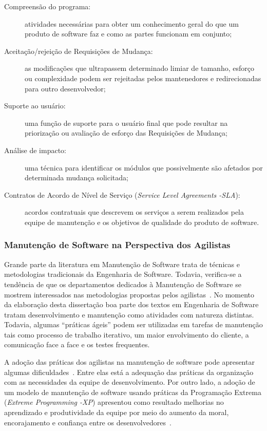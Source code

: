 \begin{description}
	\item[Compreensão do programa:] atividades necessárias para obter um
		conhecimento geral do que um produto de software faz e como as partes
		funcionam em conjunto;
    \item[Aceitação/rejeição de Requisições de Mudança:] as modificações que
        ultrapassem determinado limiar de tamanho, esforço ou complexidade podem
        ser rejeitadas pelos mantenedores e redirecionadas para outro
        desenvolvedor;
	\item[Suporte ao usuário:] uma função de suporte para o usuário final que
		pode resultar na priorização ou avaliação de esforço das Requisições
		de Mudança;
	\item[Análise de impacto:] uma técnica para identificar os módulos que
		possivelmente são afetados por determinada mudança solicitada;
	\item[Contratos de Acordo de Nível de Serviço (\textit{Service Level Agreements
		\@-\@ SLA}):] acordos contratuais que descrevem os serviços a serem
		realizados pela equipe de manutenção e os objetivos de qualidade do
		produto de software.
\end{description}

\subsubsection{Manutenção de Software na Perspectiva dos Agilistas}\label{sub:manutenção_de_software_com_método_dos_agilistas}

Grande parte da literatura em Manutenção de Software trata de técnicas e
metodologias tradicionais da Engenharia de Software. Todavia, verifica-se a
tendência de que os departamentos dedicados à Manutenção de Software se mostrem
interessados nas metodologias propostas pelos agilistas~\cite{Heeager2015}.  No
momento da elaboração desta dissertação boa parte dos textos em Engenharia de
Software tratam desenvolvimento e manutenção como atividades com natureza
distintas. Todavia, algumas ``práticas ágeis'' podem ser utilizadas em tarefas
de manutenção tais como processo de trabalho iterativo, um maior envolvimento do
cliente, a comunicação face a face e os testes frequentes.

A adoção das práticas dos agilistas na manutenção de software pode apresentar
algumas dificuldades~\cite{1402140}. Entre elas está a adequação das práticas
da organização com as necessidades da equipe de desenvolvimento. Por outro
lado, a adoção de um modelo de manutenção de software usando práticas da
Programação Extrema (\textit{Extreme Programming \@-\@ XP}) apresentou como
resultado melhorias no aprendizado e produtividade da equipe por meio do
aumento da moral, encorajamento e confiança entre os
desenvolvedores~\cite{Choudhari:2014:EIM:2557833.2557845}.

